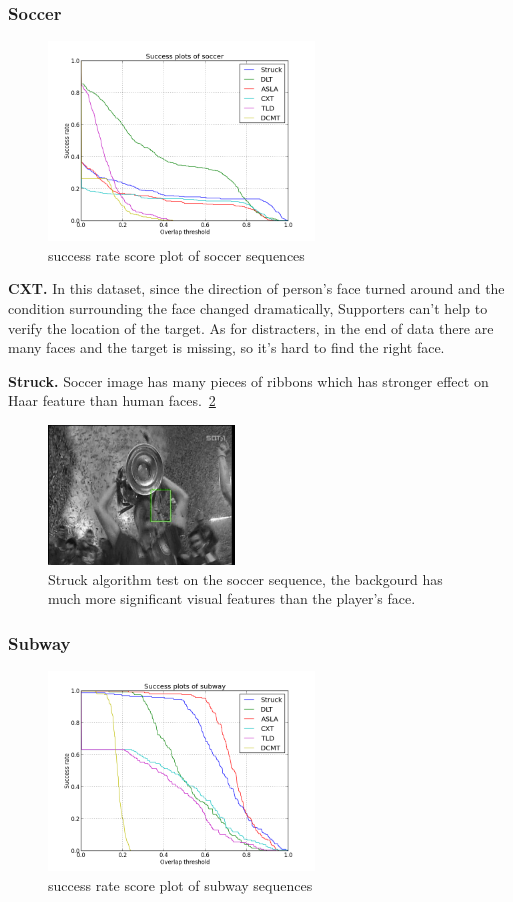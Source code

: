 \documentclass{acm_proc_article-sp}
\begin{document}
\subsubsection{Soccer}

\begin{figure}[hbt]
	\centering
    \includegraphics[width=200pt]{soccer}
    \caption{success rate score plot of soccer sequences}
    \label{fig:soccer}
\end{figure}

\textbf{CXT.} In this dataset, since the direction of person's face turned around and the condition surrounding the face changed dramatically, Supporters can't help to verify the location of the target. As for distracters, in the end of data there are many faces and the target is missing, so it's hard to find the right face.

\textbf{Struck.}
Soccer image has many pieces of ribbons which has stronger effect on Haar feature than human faces.~\ref{fig:struck_soccer}
\begin{figure}[hbt]
    \centering
    \includegraphics[width=140pt]{struck_soccer}
    \caption{Struck algorithm test on the soccer sequence, the backgourd has much more significant visual features than the player's face.}
    \label{fig:struck_soccer}
\end{figure}
\subsubsection{Subway}

\begin{figure}[hbt]
	\centering
    \includegraphics[width=200pt]{subway}
    \caption{success rate score plot of subway sequences}
    \label{fig:subway}
\end{figure}
\end{document}

